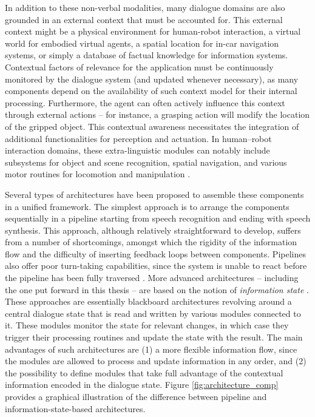 In addition to these non-verbal modalities, many dialogue domains are also grounded in an external context that must be accounted for.  This external context might be a physical environment for human-robot interaction, a virtual world for embodied virtual agents, a spatial location for in-car navigation systems, or simply a database of factual knowledge for information systems. Contextual factors of relevance for the application must be continuously monitored by the dialogue system (and updated whenever necessary), as many components depend on the availability of such context model for their internal processing.  Furthermore, the agent can often actively influence this context through external actions -- for instance, a grasping action will modify the location of the gripped object.   This contextual awareness necessitates the integration of additional functionalities for perception and actuation. In human--robot interaction domains, these extra-linguistic modules can notably include subsystems for object and scene recognition, spatial navigation, and various motor routines for locomotion and manipulation  \citep{1570637,goodrich2007human,HawesSWZJKBBS07}. 

Several types of architectures have been proposed to assemble these components in a unified framework.  The simplest approach is to arrange the components sequentially in a pipeline starting from speech recognition and ending with speech synthesis.  This approach, although relatively straightforward to develop, suffers from a number of shortcomings, amongst which the rigidity of the information flow and the difficulty of inserting feedback loops between components. Pipelines also offer poor turn-taking capabilities, since the system is unable to react before the pipeline has been fully traversed \citep{RauxE09}. More advanced architectures -- including the one put forward in this thesis -- are based on the notion of \textit{information state} \citep{Larsson:2000,Bos2003}.  These approaches are essentially blackboard architectures revolving around a central dialogue state that is read and written by various modules connected to it.  These modules monitor the state for relevant changes, in which case they trigger their processing routines and update the state with the result.  The main advantages of such architectures are (1) a more flexible information flow, since the modules are allowed to process and update information in any order, and (2) the possibility to define modules that take full advantage of the contextual information encoded in the dialogue state.  Figure \ref{fig:architecture_comp} provides a graphical illustration of the difference between pipeline and information-state-based architectures.  

